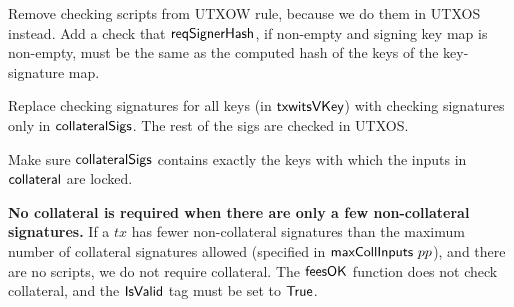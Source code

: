 Remove checking scripts from UTXOW rule, because we do them in UTXOS instead.
Add a check that $\mathsf{reqSignerHash}$, if non-empty and signing key map is non-empty,
must be the same as the computed hash of the keys of the key-signature map.

Replace checking signatures for all keys (in $\mathsf{txwitsVKey}$) with checking
signatures only in $\mathsf{collateralSigs}$. The rest of the sigs are checked in UTXOS.

Make sure $\mathsf{collateralSigs}$ contains exactly the keys with which the
inputs in $\mathsf{collateral}$ are locked.

\textbf{No collateral is required when there are only a few non-collateral signatures. }
If a $tx$ has fewer non-collateral signatures than the maximum number of collateral signatures
allowed (specified in $\mathsf{maxCollInputs}~{pp}$), and there are no scripts, we
do not require collateral. The $\mathsf{feesOK}$ function does not check
collateral, and the $\mathsf{IsValid}$ tag must be set to $\mathsf{True}$.  


